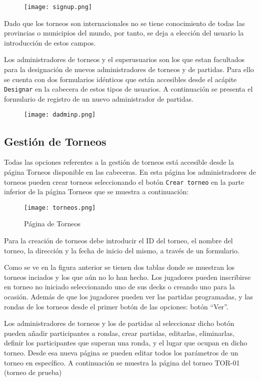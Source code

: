 \documentclass[12pt]{article}
\begin{document}
\begin{figure}[h!]
    \centering
    \texttt{[image: signup.png]}
\end{figure}

Dado que los torneos son internacionales no se tiene conocimiento de todas las provincias o municipios del mundo, por tanto, se deja a elección del usuario la introducción de estos campos. 

Los administradores de torneos y el superusuarios son los que estan facultados para la designación de nuevos administradores de torneos y de partidas. Para ello se cuenta con dos formularios idénticos que están accesibles desde el acápite \verb|Designar| en la cabecera de estos tipos de usuarios. A continuación se presenta el formulario de registro de un nuevo administrador de partidas.

\begin{figure}[h!]
    \centering
    \texttt{[image: dadminp.png]}
\end{figure}

\subsection{Gestión de Torneos}

Todas las opciones referentes a la gestión de torneos está accesible desde la página Torneos disponible en las cabeceras. En esta página los administradores de torneos pueden crear torneos seleccionando el botón \verb|Crear torneo| en la parte inferior de la página Torneos que se muestra a continuación:

\begin{figure}[h!]
    \centering
    \texttt{[image: torneos.png]}
    \caption{Página de Torneos}
\end{figure}

Para la creación de torneos debe introducir el ID del torneo, el nombre del torneo, la dirección y la fecha de inicio del mismo, a través de un formulario.

Como se ve en la figura anterior se tienen dos tablas donde se muestran los torneos inciados y los que aún no lo han hecho. Los jugadores pueden inscribirse en torneo no iniciado seleccionando uno de sus decks o creando uno para la ocasión. Además de que los jugadores pueden ver las partidas programadas, y las rondas de los torneos desde el primer botón de las opciones: botón ``Ver''.

Los administradores de torneos y los de partidas al seleccionar dicho botón pueden añadir participantes a rondas, crear partidas, editarlas, eliminarlas, definir los participantes que superan una ronda, y el lugar que ocupan en dicho torneo. Desde esa nueva página se pueden editar todos los parámetros de un torneo en específico. A continuación se muestra la página del torneo TOR-01 (torneo de prueba) 
\end{document}
